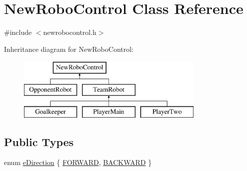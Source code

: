 \hypertarget{classNewRoboControl}{
\section{NewRoboControl Class Reference}
\label{classNewRoboControl}
}


{\ttfamily \#include $<$newrobocontrol.h$>$}

Inheritance diagram for NewRoboControl:\begin{figure}[H]
\begin{center}
\leavevmode
\includegraphics[height=3cm]{classNewRoboControl}
\end{center}
\end{figure}
\subsection*{Public Types}
\begin{DoxyCompactItemize}
\item 
enum \hyperlink{classNewRoboControl_a077fa253b827c190e82c1ce1e4c8d18f}{eDirection} \{ \hyperlink{classNewRoboControl_a077fa253b827c190e82c1ce1e4c8d18fac7af9b70b7504bd260f486172de934d9}{FORWARD}, 
\hyperlink{classNewRoboControl_a077fa253b827c190e82c1ce1e4c8d18faa55a679c9e8fbc7400c88ce3cab09c48}{BACKWARD}
 \}
\end{DoxyCompactItemize}
